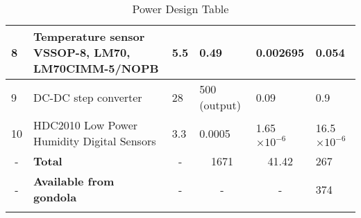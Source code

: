 \begin{longtable}{|m{}| m{} |m{} |m{}|m{}| m{} |}
8                       & Temperature sensor VSSOP-8, LM70, LM70CIMM-5/NOPB & 5.5                                         & 0.49                                         & 0.002695                                  & 0.054                                      \\ \hline
9                       & DC-DC step converter                              & 28                                          & 500 (output)                                 & 0.09                                      & 0.9                                        \\ \hline
10                      & HDC2010 Low Power Humidity Digital Sensors        & 3.3                                         & 0.0005                                       & 1.65$\times10^{-6}$                              & 16.5$\times10^{-6}$                               \\ \hline
\multicolumn{1}{|c|}{-} & \textbf{Total}                                  & \multicolumn{1}{c|}{-}                      & \multicolumn{1}{c|}{1671}                    & \multicolumn{1}{c|}{41.42}                 & 267                                        \\ \hline
\multicolumn{1}{|c|}{-} & \textbf{Available from gondola}                 & \multicolumn{1}{c|}{-}                      & \multicolumn{1}{c|}{-}                       & \multicolumn{1}{c|}{-}                    & 374                                        \\ \hline

\caption{Power Design Table}
\label{tab:power-design-table}
\end{longtable}
\raggedbottom

